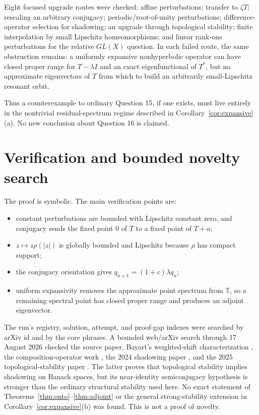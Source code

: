 \documentclass[11pt]{article}
\newcommand{\Torus}{\mathbb T}
\begin{document}
Eight focused upgrade routes were checked: affine perturbations; transfer to $\zeta T$;
rescaling an arbitrary conjugacy; periodic/root-of-unity perturbations; difference-operator
selection for shadowing; an upgrade through topological stability; finite interpolation by
small Lipschitz homeomorphisms; and linear rank-one perturbations for the relative
$GL(X)$ question. In each failed route, the same obstruction remains: a uniformly
expansive nonhyperbolic operator can have closed proper range for $T-\lambda I$ and an
exact eigenfunctional of $T^*$, but no approximate eigenvectors of $T$ from which to
build an arbitrarily small-Lipschitz resonant orbit.

Thus a counterexample to ordinary Question 15, if one exists, must live entirely in the
nontrivial residual-spectrum regime described in Corollary~\ref{cor:expansive}(a). No
new conclusion about Question 16 is claimed.

\section{Verification and bounded novelty search}

The proof is symbolic. The main verification points are:
\begin{itemize}[leftmargin=2em]
\item constant perturbations are bounded with Lipschitz constant zero, and conjugacy
      sends the fixed point $0$ of $T$ to a fixed point of $T+a$;
\item $z\mapsto z\rho(|z|)$ is globally bounded and Lipschitz because $\rho$ has
      compact support;
\item the conjugacy orientation gives $q_{n+1}=(1+c)\lambda q_n$;
\item uniform expansivity removes the approximate point spectrum from $\Torus$, so a
      remaining spectral point has closed proper range and produces an adjoint eigenvector.
\end{itemize}

The run's registry, solution, attempt, and proof-gap indexes were searched by arXiv id
and by the core phrases. A bounded web/arXiv search through 17 August 2026 checked
the source paper, Bayart's weighted-shift characterization \cite{Bayart21}, the
composition-operator work \cite{Maiuriello22}, the 2024 shadowing paper
\cite{BP24}, and the 2025 topological-stability paper \cite{BCDFP25}. The latter proves
that topological stability implies shadowing on Banach spaces, but its near-identity
semiconjugacy hypothesis is stronger than the ordinary structural stability used here.
No exact statement of Theorems~\ref{thm:onto}--\ref{thm:adjoint} or the general
strong-stability extension in Corollary~\ref{cor:expansive}(b) was found. This is not a
proof of novelty.
\end{document}

